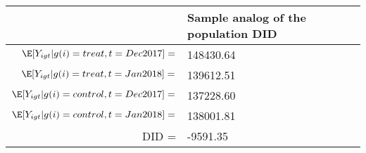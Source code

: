 \begin{tabular}{rl}
\toprule
 & Sample analog of the population DID \\
\midrule
$\E[Y_{igt}|g(i) = treat, t=Dec2017]=$ & 148430.64 \\
$\E[Y_{igt}|g(i) = treat, t=Jan2018]=$ & 139612.51 \\
$\E[Y_{igt}|g(i) = control, t=Dec2017]=$ & 137228.60 \\
$\E[Y_{igt}|g(i) = control, t=Jan2018]=$ & 138001.81 \\
\midrule DID = & -9591.35 \\
\bottomrule
\end{tabular}

